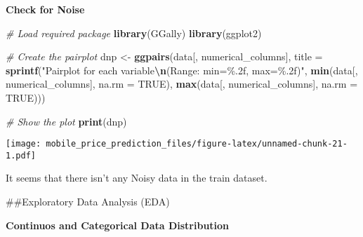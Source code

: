 \documentclass[
]{article}
\newenvironment{Shaded}{\begin{snugshade}}{\end{snugshade}}
\newcommand{\AttributeTok}[1]{\textcolor[rgb]{0.13,0.29,0.53}{#1}}
\newcommand{\CommentTok}[1]{\textcolor[rgb]{0.56,0.35,0.01}{\textit{#1}}}
\newcommand{\ConstantTok}[1]{\textcolor[rgb]{0.56,0.35,0.01}{#1}}
\newcommand{\FunctionTok}[1]{\textcolor[rgb]{0.13,0.29,0.53}{\textbf{#1}}}
\newcommand{\NormalTok}[1]{#1}
\newcommand{\OtherTok}[1]{\textcolor[rgb]{0.56,0.35,0.01}{#1}}
\newcommand{\SpecialCharTok}[1]{\textcolor[rgb]{0.81,0.36,0.00}{\textbf{#1}}}
\newcommand{\StringTok}[1]{\textcolor[rgb]{0.31,0.60,0.02}{#1}}
\begin{document}
\textbf{Check for Noise}

\begin{Shaded}
\begin{Highlighting}[]
\CommentTok{\# Load required package}
\FunctionTok{library}\NormalTok{(GGally)}
\FunctionTok{library}\NormalTok{(ggplot2)}

\CommentTok{\# Create the pairplot}
\NormalTok{dnp }\OtherTok{\textless{}{-}} \FunctionTok{ggpairs}\NormalTok{(data[, numerical\_columns], }
               \AttributeTok{title =} \FunctionTok{sprintf}\NormalTok{(}\StringTok{"Pairplot for each variable}\SpecialCharTok{\textbackslash{}n}\StringTok{(Range: min=\%.2f, max=\%.2f)"}\NormalTok{,}
                               \FunctionTok{min}\NormalTok{(data[, numerical\_columns], }\AttributeTok{na.rm =} \ConstantTok{TRUE}\NormalTok{), }
                               \FunctionTok{max}\NormalTok{(data[, numerical\_columns], }\AttributeTok{na.rm =} \ConstantTok{TRUE}\NormalTok{)))}

\CommentTok{\# Show the plot}
\FunctionTok{print}\NormalTok{(dnp)}
\end{Highlighting}
\end{Shaded}

\texttt{[image: mobile\_price\_prediction\_files/figure-latex/unnamed-chunk-21-1.pdf]}

It seems that there isn't any Noisy data in the train dataset.

\#\#Exploratory Data Analysis (EDA)

\textbf{Continuos and Categorical Data Distribution}
\end{document}
